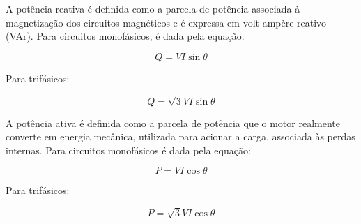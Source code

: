 A potência reativa é definida como a parcela de potência associada à magnetização dos
circuitos magnéticos e é expressa em volt-ampère reativo (VAr). Para circuitos monofásicos, é dada pela equação:

$$Q = VI \sin{\theta}$$

Para trifásicos:

$$Q = \sqrt{3}{VI} \sin{\theta}$$

A potência ativa é definida como a parcela de potência que o motor realmente converte em
energia mecânica, utilizada para acionar a carga, associada às perdas internas. Para circuitos monofásicos é dada pela equação:

$$P = VI \cos{\theta}$$

Para trifásicos:

$$P = \sqrt{3} VI \cos{\theta}$$

